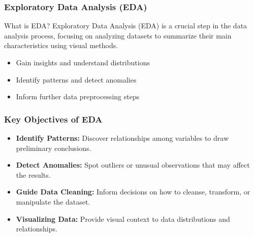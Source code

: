 \documentclass{beamer}
\begin{document}
\begin{frame}[fragile]
    \frametitle{Exploratory Data Analysis (EDA)}
    \begin{block}{What is EDA?}
        Exploratory Data Analysis (EDA) is a crucial step in the data analysis process, focusing on analyzing datasets to summarize their main characteristics using visual methods. 
        \begin{itemize}
            \item Gain insights and understand distributions
            \item Identify patterns and detect anomalies
            \item Inform further data preprocessing steps
        \end{itemize}
    \end{block}
\end{frame}

\begin{frame}[fragile]
    \frametitle{Key Objectives of EDA}
    \begin{itemize}
        \item \textbf{Identify Patterns:} Discover relationships among variables to draw preliminary conclusions.
        \item \textbf{Detect Anomalies:} Spot outliers or unusual observations that may affect the results.
        \item \textbf{Guide Data Cleaning:} Inform decisions on how to cleanse, transform, or manipulate the dataset.
        \item \textbf{Visualizing Data:} Provide visual context to data distributions and relationships.
    \end{itemize}
\end{frame}
\end{document}

